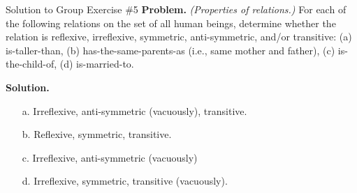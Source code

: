 \documentclass[10pt]{beamer}
\begin{document}
\begin{frame}{Solution to Group Exercise \#5}
\textbf{Problem.} \textit{(Properties of relations.)} 
For each of the following relations on the set of all human beings, determine whether the relation is reflexive, irreflexive, symmetric, anti-symmetric, and/or transitive: (a) is-taller-than, (b) has-the-same-parents-as (i.e., same mother and father), (c)  is-the-child-of, (d) is-married-to.
	
\vfill 
\textbf{Solution.} 

\begin{itemize}
\item[a.] Irreflexive, anti-symmetric (vacuously), transitive.
\item[b.] Reflexive, symmetric, transitive.
\item[c.] Irreflexive, anti-symmetric (vacuously)
\item[d.] Irreflexive, symmetric, transitive (vacuously).
\end{itemize}

\end{frame}
\end{document}
